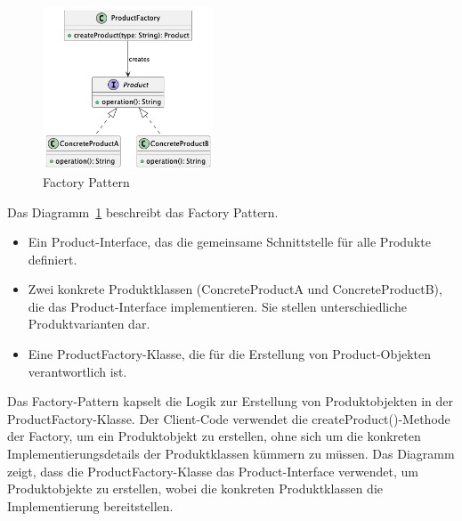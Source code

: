 \documentclass[../vs-script-first-v01.tex]{subfiles}
\begin{document}
\begin{figure}[!ht]
  \centering
  \includegraphics[width=0.45\textwidth]{fig/uml/factory-class.png}
  \caption{Factory Pattern}
  \label{fig:factory-class}
\end{figure}
Das Diagramm~\ref{fig:factory-class} beschreibt das Factory Pattern.
\begin{itemize}
\item Ein Product-Interface, das die gemeinsame Schnittstelle für alle Produkte definiert.
\item Zwei konkrete Produktklassen (ConcreteProductA und ConcreteProductB), die das Product-Interface implementieren. Sie stellen unterschiedliche Produktvarianten dar.
\item Eine ProductFactory-Klasse, die für die Erstellung von Product-Objekten verantwortlich ist.
\end{itemize}
Das Factory-Pattern kapselt die Logik zur Erstellung von Produktobjekten in der ProductFactory-Klasse. Der Client-Code verwendet die createProduct()-Methode der Factory, um ein Produktobjekt zu erstellen, ohne sich um die konkreten Implementierungsdetails der Produktklassen kümmern zu müssen. Das Diagramm zeigt, dass die ProductFactory-Klasse das Product-Interface verwendet, um Produktobjekte zu erstellen, wobei die konkreten Produktklassen die Implementierung bereitstellen.
\end{document}
